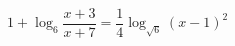\begin{ex}[type=equation]
	\begin{condition}
		$1 + \log_6 \dfrac{x + 3}{x + 7} = \dfrac{1}{4}\log_{\sqrt{6}}(x- 1)^2$
	\end{condition}
\end{ex}